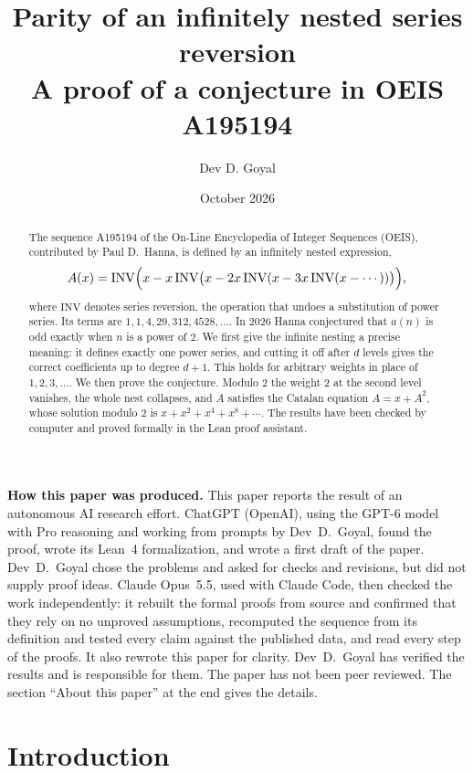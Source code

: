 \documentclass[11pt,a4paper]{article}
\title{Parity of an infinitely nested series reversion\\[6pt]\large A proof of a conjecture in OEIS A195194}
\author{Dev D. Goyal}
\date{October 2026}
\theoremstyle{definition}
\theoremstyle{remark}
\begin{document}
\maketitle
\begin{abstract}
The sequence A195194 of the On-Line Encyclopedia of Integer Sequences (OEIS), contributed by Paul D.~Hanna, is defined
by an infinitely nested expression,
\[
A(x)=\mathrm{INV}\Bigl(x-x\,\mathrm{INV}\bigl(x-2x\,\mathrm{INV}(x-3x\,\mathrm{INV}(x-\cdots))\bigr)\Bigr),
\]
where $\mathrm{INV}$ denotes series reversion, the operation that undoes a substitution of power series. Its terms are
$1,1,4,29,312,4528,\dots$. In 2026 Hanna conjectured that $a(n)$ is odd exactly when $n$ is a power of $2$. We first give
the infinite nesting a precise meaning: it defines exactly one power series, and cutting it off after $d$ levels gives
the correct coefficients up to degree $d+1$. This holds for arbitrary weights in place of $1,2,3,\dots$. We then prove the
conjecture. Modulo $2$ the weight $2$ at the second level vanishes, the whole nest collapses, and $A$ satisfies the
Catalan equation $A=x+A^2$, whose solution modulo $2$ is $x+x^2+x^4+x^8+\cdots$. The results have been checked by
computer and proved formally in the Lean proof assistant.
\end{abstract}
\begin{center}\begin{minipage}{0.88\linewidth}\small
\textbf{How this paper was produced.} This paper reports the result of an autonomous AI research effort.
ChatGPT (OpenAI), using the GPT-6 model with Pro reasoning and working from prompts by Dev~D.~Goyal, found the proof, wrote its Lean~4 formalization, and wrote a first draft of the paper.
Dev~D.~Goyal chose the problems and asked for checks and revisions, but did not supply proof ideas.
Claude Opus~5.5, used with Claude Code, then checked the work independently: it rebuilt the formal proofs from
source and confirmed that they rely on no unproved assumptions, recomputed the sequence from its definition and tested
every claim against the published data, and read every step of the proofs. It also rewrote this paper for clarity.
Dev~D.~Goyal has verified the results and is responsible for them. The paper has not been peer reviewed.
The section ``About this paper'' at the end gives the details.
\end{minipage}\end{center}

\section{Introduction}
\end{document}
